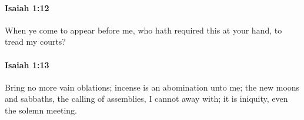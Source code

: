 		\paragraph{Isaiah 1:12} %
			\label{ISAIAH-1-12}

			When ye come to appear before me, who hath required this at your hand, to tread my courts?


		\paragraph{Isaiah 1:13} %
			\label{ISAIAH-1-13}

			Bring no more vain oblations; incense is an abomination unto me; the new moons and sabbaths, the calling of assemblies, I cannot away with; it is iniquity, even the solemn meeting.


